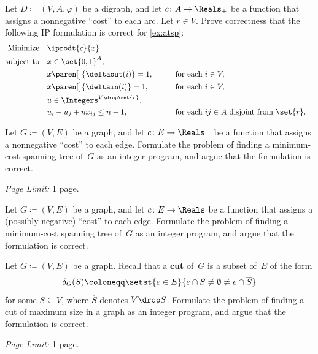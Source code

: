 \documentclass[11pt,leqno,final]{amsart}
\begin{document}
\begin{exercise}
  Let \(D \coloneqq (V,A,\varphi)\) be a digraph, and let
  \(c \colon A \to \Reals_+\) be a function that assigns a nonnegative
  ``cost'' to each arc.
  Let \(r \in V\).
  Prove correctness that the following IP formulation
  is correct for \cref{ex:atsp}:
  \begin{alignat*}{3}
    \text{Minimize} \quad
    & \iprodt{c}{x} &
    \\[0pt]
    \text{subject to}\quad
    & x \in \set{0,1}^A, &&
    \\[0pt]
    & x\paren[\big]{\deltaout(i)} = 1, &&
    \qquad \text{for each }i \in V,
    \\[0pt]
    & x\paren[\big]{\deltain(i)} = 1, &&
    \qquad \text{for each }i \in V,
    \\[0pt]
    & u \in \Integers^{V \drop \set{r}}, &&
    \\[0pt]
    & u_i - u_j + n x_{ij} \leq n-1, &&
    \qquad \text{for each }ij \in A\text{ disjoint from }\set{r}.
  \end{alignat*}
\end{exercise}

\begin{exercise}
  \label{ex:sptree-ip}
  Let \(G \coloneqq (V,E)\) be a graph, and let
  \(c \colon E \to \Reals_+\) be a function that assigns a nonnegative
  ``cost'' to each edge.
  Formulate the problem of finding a minimum-cost spanning tree
  of~\(G\) as an integer program, and argue that the formulation is
  correct.

  \smallskip
  \noindent\small
  \textit{Page Limit:} 1 page.
\end{exercise}

\begin{exercise}
  \label{ex:sptree-neg}
  Let \(G \coloneqq (V,E)\) be a graph, and let
  \(c \colon E \to \Reals\) be a function that assigns a (possibly negative)
  ``cost'' to each edge.
  Formulate the problem of finding a minimum-cost spanning tree
  of~\(G\) as an integer program, and argue that the formulation is
  correct.
\end{exercise}

\begin{exercise}
  \label{ex:maxcut-ip}
  Let \(G \coloneqq (V,E)\) be a graph.
  Recall that a \textbf{cut} of~\(G\) is a subset of~\(E\) of the form
  \begin{equation*}
    \delta_G(S)
    \coloneqq
    \setst{
      e \in E
    }{
      e \cap S \neq \emptyset \neq
      e \cap \overline{S}
    }
  \end{equation*}
  for some \(S \subseteq V\), where \(\overline{S}\) denotes
  \(V \drop S\).
  Formulate the problem of finding a cut of maximum size in a graph as
  an integer program, and argue that the formulation is correct.

  \smallskip
  \noindent\small
  \textit{Page Limit:} 1 page.

\end{exercise}
\end{document}
